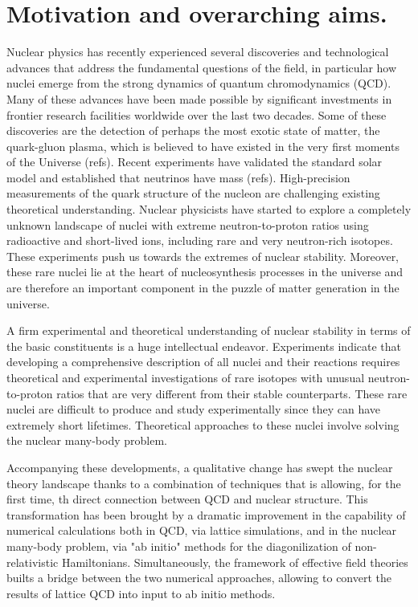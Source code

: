 \chapter{Motivation and overarching aims.}
\author{Morten Hjorth-Jensen, Maria Paola Lombardo and Ubirajara Van Kolck}





Nuclear physics has recently experienced several discoveries and
technological advances that address the fundamental questions of the
field, in particular how nuclei emerge from the strong dynamics
of quantum chromodynamics (QCD).
Many of these advances have been made possible by significant
investments in frontier research facilities worldwide over the last
two decades. Some of these discoveries are the detection of perhaps
the most exotic state of matter, the quark-gluon plasma, which is
believed to have existed in the very first moments of the Universe
(refs).  Recent experiments have validated the standard solar model
and established that neutrinos have mass (refs). High-precision
measurements of the quark structure of the nucleon are challenging
existing theoretical understanding.  Nuclear physicists have started
to explore a completely unknown landscape of nuclei with extreme
neutron-to-proton ratios using radioactive and short-lived ions,
including rare and very neutron-rich isotopes.  These experiments push
us towards the extremes of nuclear stability.  Moreover, these rare
nuclei lie at the heart of nucleosynthesis processes in the universe
and are therefore an important component in the puzzle of matter
generation in the universe.

A firm experimental and theoretical understanding of nuclear stability
in terms of the basic constituents is a huge intellectual endeavor.
Experiments indicate that developing a comprehensive description of
all nuclei and their reactions requires theoretical and experimental
investigations of rare isotopes with unusual neutron-to-proton ratios
that are very different from their stable counterparts.  These rare
nuclei are difficult to produce and study experimentally since they
can have extremely short lifetimes. Theoretical approaches to these
nuclei involve solving the nuclear many-body problem.

Accompanying these developments, a qualitative change has swept the
nuclear theory landscape thanks to a combination of techniques that is
allowing, for the first time, th direct connection between QCD and
nuclear structure. This transformation has been brought by a dramatic
improvement in the capability of numerical calculations both in QCD,
via lattice simulations, and in the nuclear many-body problem, via "ab
initio" methods for the diagonilization of non-relativistic
Hamiltonians. Simultaneously, the framework of effective field
theories builts a bridge between the two numerical approaches,
allowing to convert the results of lattice QCD into input to ab initio
methods.

